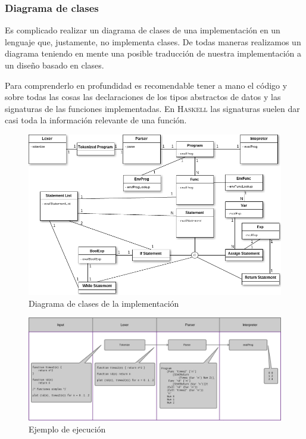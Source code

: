 \subsubsection{Diagrama de clases}
Es complicado realizar un diagrama de clases de una implementaci\'on en un lenguaje
que, justamente, no implementa clases. De todas maneras realizamos un diagrama
teniendo en mente una posible traducci\'on de nuestra implementaci\'on a un dise\~no
basado en clases.

Para comprenderlo en profundidad es recomendable tener a mano el c\'odigo y sobre
todas las cosas las declaraciones de los tipos abstractos de datos y las signaturas
de las funciones implementadas. En \textsc{Haskell} las signaturas suelen dar casi
toda la informaci\'on relevante de una funci\'on.

\begin{figure}[!ht]
    \centering
    \includegraphics[width=\textwidth]{ClassDiagram.png}
    \caption{Diagrama de clases de la implementaci\'on}
\end{figure}

\begin{figure}[!ht]
    \centering
    \includegraphics[width=\textwidth]{Flowchart.png}
    \caption{Ejemplo de ejecuci\'on}
\end{figure}


